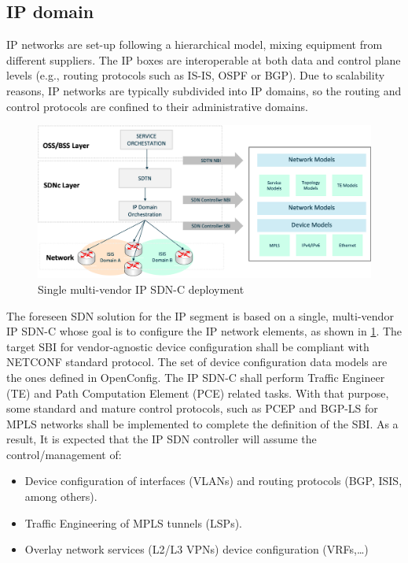 \documentclass[a4paper,fleqn]{cas-dc}
\begin{document}
\subsection {IP domain}
\label{section:ip}
IP networks are set-up following a hierarchical model, mixing equipment from different suppliers. The IP boxes are interoperable at both data and control plane levels (e.g., routing protocols such as IS-IS, OSPF or BGP). Due to scalability reasons, IP networks are typically subdivided into IP domains, so the routing and control protocols are confined to their administrative domains.

\begin{figure}
	\centering
		\includegraphics[scale=0.5]{figs/ifusion_multidomain_2.png}
	\caption{Single multi-vendor IP SDN-C deployment}
	\label{FIG:2}
\end{figure}

The foreseen SDN solution for the IP segment is based on a single, multi-vendor IP SDN-C whose goal is to configure the IP network elements, as shown in \cref{FIG:2}. The target SBI for vendor-agnostic device configuration shall be compliant with NETCONF standard protocol. The set of device configuration data models are the ones defined in OpenConfig. 
The IP SDN-C shall perform Traffic Engineer (TE) and Path Computation Element (PCE) related tasks. With that purpose, some standard and mature control protocols, such as PCEP and BGP-LS for MPLS networks shall be implemented to complete the definition of the SBI. As a result, It is expected that the IP SDN controller will assume the control/management of:
\begin{itemize}
\item Device configuration of interfaces (VLANs) and routing protocols (BGP, ISIS, among others).
\item Traffic Engineering of MPLS tunnels (LSPs). 
\item Overlay network services (L2/L3 VPNs) device configuration (VRFs,\dots)
\end{itemize}
\end{document}
